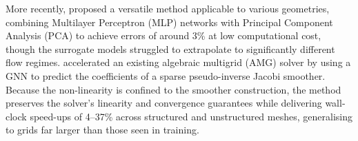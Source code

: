 More recently, \textcite{Sousa2024} proposed a versatile method applicable to various geometries, combining Multilayer Perceptron (MLP) networks with Principal Component Analysis (PCA) to achieve errors of around 3\% at low computational cost, though the surrogate models struggled to extrapolate to significantly different flow regimes. \textcite{Chilln2026} accelerated an existing algebraic multigrid (AMG) solver by using a GNN to predict the coefficients of a sparse pseudo-inverse Jacobi smoother. Because the non-linearity is confined to the smoother construction, the method preserves the solver's linearity and convergence guarantees while delivering wall-clock speed-ups of 4--37\% across structured and unstructured meshes, generalising to grids far larger than those seen in training.



